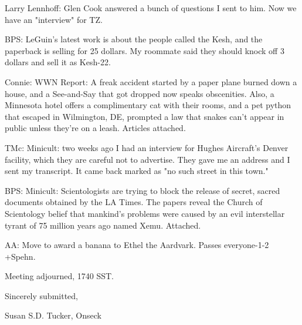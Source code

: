 \documentclass[12pt]{article}
\begin{document}
Larry Lennhoff: Glen Cook answered a bunch of questions I sent to him. Now we have an "interview" for TZ.

BPS: LeGuin's latest work is about the people called the Kesh, and the paperback is selling for 25 dollars. My roommate said they should knock off 3 dollars and sell it as Kesh-22.

Connie: WWN Report: A freak accident started by a paper plane burned down a house, and a See-and-Say that got dropped now speaks obscenities. Also, a Minnesota hotel offers a complimentary cat with their rooms, and a pet python that escaped in Wilmington, DE, prompted a law that snakes can't appear in public unless they're on a leash. Articles attached.

TMc: Minicult: two weeks ago I had an interview for Hughes Aircraft's Denver facility, which they are careful not to advertise. They gave me an address and I sent my transcript. It came back marked as "no such street in this town."

BPS: Minicult: Scientologists are trying to block the release of secret, sacred documents obtained by the LA Times. The papers reveal the Church of Scientology belief that mankind's problems were caused by an evil interstellar tyrant of 75 million years ago named Xemu. Attached.

AA: Move to award a banana to Ethel the Aardvark. Passes everyone-1-2 +Spehn.

\vspace{12pt}

\noindent
Meeting adjourned, 1740 SST.

\vspace{18pt}

\centerline{Sincerely submitted,}
\centerline{Susan S.D. Tucker, Onseck}
\end{document}
